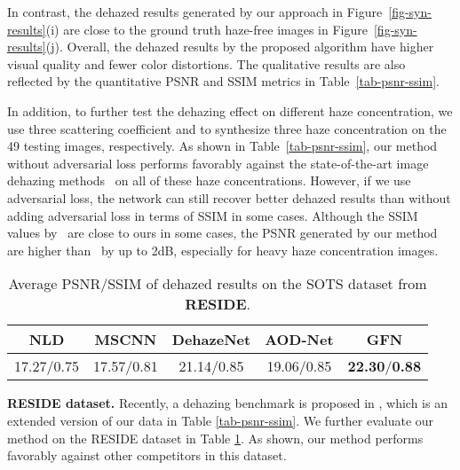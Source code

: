 \documentclass[10pt,twocolumn,letterpaper]{article}
\begin{document}
In contrast, the dehazed results generated by our approach in Figure~\ref{fig-syn-results}(i) are close to the ground truth
haze-free images in Figure~\ref{fig-syn-results}(j).
Overall, the dehazed results by the proposed algorithm have higher
visual quality and fewer color distortions.
The qualitative results are also reflected
by the quantitative PSNR and SSIM metrics in Table~\ref{tab-psnr-ssim}.




In addition, to further test the dehazing effect on different haze concentration,
we use three scattering coefficient  and  to synthesize three haze concentration on the 49 testing images, respectively.
As shown in Table~\ref{tab-psnr-ssim}, our method without adversarial loss performs favorably against the state-of-the-art image dehazing methods~\cite{he2011single,meng2013efficient,berman2016non,zhu2015fast,ren2016single,cai2016dehazenet,li2017aod} on all of these haze concentrations.
However, if we use adversarial loss, the network can still recover better dehazed results
than without adding adversarial loss in terms of SSIM in some cases.
Although the SSIM values by~\cite{li2017aod} are close to ours in some cases, the PSNR generated by our method are higher than~\cite{li2017aod} by up to 2dB, especially for heavy haze concentration images.



\begin{table}[htbp]
	\caption{Average PSNR/SSIM of dehazed results on the SOTS dataset from \textbf{RESIDE}.}
	\vspace{-0.5cm}
	\begin{center}\scriptsize{
			\begin{tabular}{ccccc}
				\toprule
				NLD \cite{berman2016non}  & MSCNN \cite{ren2016single}  & DehazeNet \cite{cai2016dehazenet} & AOD-Net \cite{li2017aod} & GFN \\
				\midrule
				17.27/0.75  & 17.57/0.81 &  21.14/0.85  &  19.06/0.85  & \textbf{22.30}/\textbf{0.88}\\
				\bottomrule
		\end{tabular}}
		\label{tab-reside}
	\end{center}
	\vspace{-0.8cm}
\end{table}
\vspace{-0.2cm}
{\flushleft \textbf{RESIDE dataset.}} Recently, a dehazing benchmark is proposed in \cite{li2017reside}, which is an extended version of our data in Table \ref{tab-psnr-ssim}. We further evaluate our method on the RESIDE dataset in Table \ref{tab-reside}. As shown, our method performs favorably against other competitors \cite{berman2016non,cai2016dehazenet,li2017aod,ren2016single} in this dataset.
\end{document}
